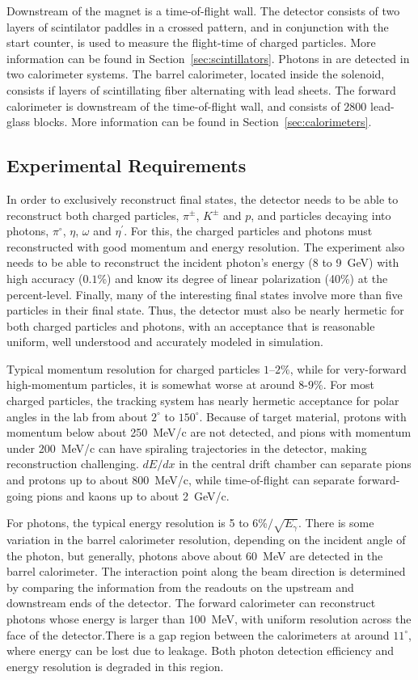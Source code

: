 Downstream of the magnet is a time-of-flight wall. The detector consists of two layers of scintilator paddles in a crossed pattern, and in conjunction with the start counter, is used to measure the flight-time of charged particles. More information can be found in Section~\ref{sec:scintillators}. 
Photons in \gx{} are detected in two calorimeter systems. The barrel calorimeter, located inside the solenoid, consists if layers of scintillating fiber alternating with lead sheets. The forward calorimeter is downstream of the time-of-flight wall, and consists of $2800$ lead-glass blocks. More information can be found in Section~\ref{sec:calorimeters}.

\subsection[Experimental Requirements]{Experimental Requirements \label{sec:intro:requirements}}
In order to exclusively reconstruct final states, the \gx{} detector needs to be able to reconstruct both charged particles, $\pi^{\pm}$, $K^{\pm}$ and $p$, and particles decaying into photons, $\pi^{\circ}$, $\eta$, $\omega$ and $\eta^{\prime}$. For this, the charged particles and photons must reconstructed with good momentum and energy resolution. The experiment also needs to be able to reconstruct the incident photon's energy (8 to 9~GeV) with high accuracy ($0.1$\%) and know its degree of linear polarization (40\%) at the percent-level. Finally, many of the interesting final states involve more than five particles in their final state. Thus, the \gx{} detector must also be nearly hermetic for both charged particles and photons, with an acceptance that is reasonable uniform, well understood and accurately modeled in simulation.

Typical momentum resolution for charged particles $1$--$2\%$, while for very-forward high-momentum particles, it is somewhat worse at around $8$-$9\%$. For most charged particles, the tracking system has nearly hermetic acceptance for polar angles in the lab from about $2^{\circ}$ to $150^{\circ}$. Because of target material, protons with momentum below about 250~MeV/c are not detected, and pions with momentum under 200~MeV/c can have spiraling trajectories in the detector, making reconstruction challenging. $dE/dx$ in the central drift chamber can separate pions and protons up to about 800~MeV/c, while time-of-flight can separate forward-going pions and kaons up to about 2~GeV/c.

For photons, the typical energy resolution is 5 to 6\%$/\sqrt{E_{\gamma}}$. There is some variation in the barrel calorimeter resolution, depending on the incident angle of the photon, but generally, photons above about 60~MeV are detected in the barrel calorimeter. The interaction point along the beam direction is determined by comparing the information from the readouts on the upstream and downstream ends of the detector. The forward calorimeter can reconstruct photons whose energy is larger than 100~MeV, with uniform resolution across the face of the detector.There is a gap region between the calorimeters at around $11^{\circ}$, where energy can be lost due to leakage. Both photon detection efficiency and energy resolution is degraded in this region. 
 
